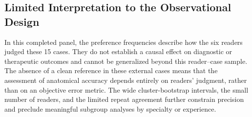 \subsection{Limited Interpretation to the Observational Design}

In this completed panel, the preference frequencies describe how the six readers judged these 15 cases. They do not establish a causal effect on diagnostic or therapeutic outcomes and cannot be generalized beyond this reader--case sample. The absence of a clean reference in these external cases means that the assessment of anatomical accuracy depends entirely on readers' judgment, rather than on an objective error metric. The wide cluster-bootstrap intervals, the small number of readers, and the limited repeat agreement further constrain precision and preclude meaningful subgroup analyses by specialty or experience.
